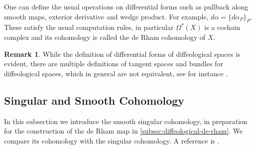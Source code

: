 \documentclass{scrartcl}
\theoremstyle{plain}
\theoremstyle{definition}
\newtheorem{remark}[theorem]{Remark}
\begin{document}
One can define the usual operations on differential forms such as pullback along smooth maps, exterior derivative and wedge product. For example, $d\alpha = \{d\alpha_P\}_P$. These satisfy the usual computation rules, in particular $\Omega^*(X)$ is a cochain complex and its cohomology is called the de Rham cohomology of $X$. 

\begin{remark}
    While the definition of differential forms of diffeological spaces is evident, there are multiple definitions of tangent spaces and bundles for diffeological spaces, which in general are not equivalent, see for instance \cite{christensen2015tangent}.
\end{remark}



\subsection{Singular and Smooth Cohomology} \label{subsec:diffeology-cohomology}

In this subsection we introduce the smooth singular cohomology, in preparation for the construction of the de Rham map in \cref{subsec:diffeological-de-rham}. We compare its cohomology with the singular cohomology. A reference is \cite{gurer2014topologie}.
\end{document}
